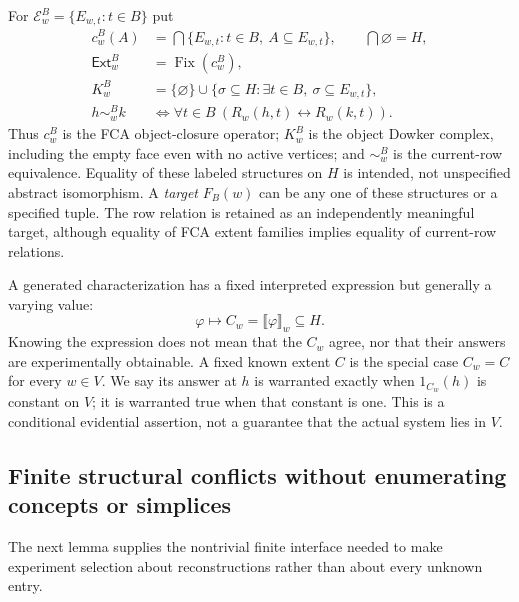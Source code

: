 \documentclass[11pt]{article}
\theoremstyle{definition}
\newcommand{\Ext}{\mathsf{Ext}}
\newcommand{\Fix}{\operatorname{Fix}}
\begin{document}
For $\mathcal E^B_w=\{E_{w,t}:t\in B\}$ put
\begin{align*}
 c^B_w(A)&=\bigcap\{E_{w,t}:t\in B,\ A\subseteq E_{w,t}\},\qquad \bigcap\varnothing=H,\\
 \Ext^B_w&=\Fix(c^B_w),\\
 K^B_w&=\{\varnothing\}\cup\{\sigma\subseteq H:\exists t\in B,\ \sigma\subseteq E_{w,t}\},\\
 h\sim^B_w k&\Longleftrightarrow\forall t\in B\ (R_w(h,t)\leftrightarrow R_w(k,t)).
\end{align*}
Thus $c^B_w$ is the FCA object-closure operator; $K^B_w$ is the object Dowker complex, including the empty face even with no active vertices; and $\sim^B_w$ is the current-row equivalence. Equality of these labeled structures on $H$ is intended, not unspecified abstract isomorphism. A \emph{target} $F_B(w)$ can be any one of these structures or a specified tuple. The row relation is retained as an independently meaningful target, although equality of FCA extent families implies equality of current-row relations.

A generated characterization has a fixed interpreted expression but generally a varying value:
\[
 \varphi\longmapsto C_w=\llbracket\varphi\rrbracket_w\subseteq H.
\]
Knowing the expression does not mean that the $C_w$ agree, nor that their answers are experimentally obtainable. A fixed known extent $C$ is the special case $C_w=C$ for every $w\in V$. We say its answer at $h$ is warranted exactly when $1_{C_w}(h)$ is constant on $V$; it is warranted true when that constant is one. This is a conditional evidential assertion, not a guarantee that the actual system lies in $V$.

\subsection{Finite structural conflicts without enumerating concepts or simplices}
The next lemma supplies the nontrivial finite interface needed to make experiment selection about reconstructions rather than about every unknown entry.
\end{document}
